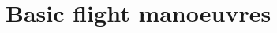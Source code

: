 \documentclass[Orbiter User Manual.tex]{subfiles}
\begin{document}
\section{Basic flight manoeuvres}

\end{document}
